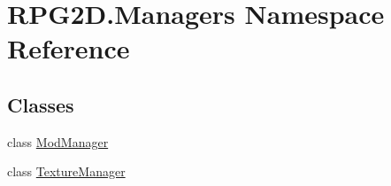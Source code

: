 \hypertarget{namespace_r_p_g2_d_1_1_managers}{}\section{R\+P\+G2\+D.\+Managers Namespace Reference}
\label{namespace_r_p_g2_d_1_1_managers}
\subsection*{Classes}
\begin{DoxyCompactItemize}
\item 
class \mbox{\hyperlink{class_r_p_g2_d_1_1_managers_1_1_mod_manager}{Mod\+Manager}}
\item 
class \mbox{\hyperlink{class_r_p_g2_d_1_1_managers_1_1_texture_manager}{Texture\+Manager}}
\end{DoxyCompactItemize}
